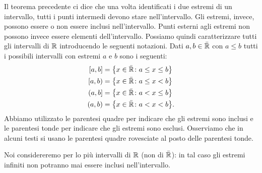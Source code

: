 Il teorema precedente ci dice che una volta identificati i due estremi
di un intervallo, tutti i punti intermedi devono stare nell'intervallo.
Gli estremi, invece, possono essere o non essere inclusi nell'intervallo.
Punti esterni agli estremi non possono invece essere elementi dell'intervallo.
Possiamo quindi caratterizzare tutti gli intervalli di ${\mathbb R}$
introducendo le seguenti notazioni. Dati $a,b\in \bar {{\mathbb R}}$ con $a\le b$
tutti i possibili intervalli con estremi $a$ e $b$ sono i seguenti:
\begin{equation}\label{eq:499494}
\begin{aligned}
\left[a,b\right] &= {\left\{ x\in \bar {{\mathbb R}}\colon a \le x \le b \right\}} \\
\left[a,b\right) &= {\left\{ x\in \bar {{\mathbb R}}\colon a \le x < b \right\}} \\
\left(a,b\right] &= {\left\{ x\in \bar {{\mathbb R}}\colon a < x \le b \right\}}\\
\left(a,b\right) &= {\left\{ x\in \bar {{\mathbb R}}\colon a < x < b \right\}}.
\end{aligned}
\end{equation}
Abbiamo utilizzato le parentesi quadre per indicare che gli estremi
sono inclusi e le parentesi tonde per indicare che gli estremi sono esclusi.
Osserviamo che in alcuni testi si usano le parentesi quadre rovesciate al posto
delle parentesi tonde.

Noi considereremo per lo più intervalli di ${\mathbb R}$ (non di $\bar {{\mathbb R}}$): in tal
caso gli estremi infiniti non potranno mai essere inclusi nell'intervallo.


